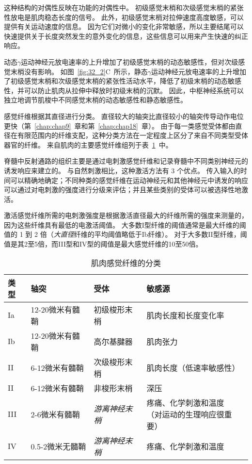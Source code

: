 \begin{proposition}[肌梭]
	\quad \quad 这种结构的对偶性反映在功能的对偶性中。
	初级感觉末梢和次级感觉末梢的紧张性放电是肌肉稳态长度的信号。
	此外，初级感觉末梢对拉伸速度高度敏感，可以提供有关运动速度的信息。
	因为它们对微小的变化非常敏感，所以主要结尾可以快速提供关于长度突然发生的意外变化的信息，这些信息可以用来产生快速的纠正响应。
	
	\quad \quad 动态$ \gamma $运动神经元放电速率的上升增加了初级感觉末梢的动态敏感性，但对次级感觉末梢没有影响。
	如图~\ref{fig:32_2}C~所示，静态$ \gamma $运动神经元放电速率的上升增加了初级感觉末梢和次级感觉末梢的紧张性活动水平，降低了初级末梢的动态敏感性，并可以防止肌肉从拉伸中释放时初级末梢的沉默。
	因此，中枢神经系统可以独立地调节肌梭中不同感觉末梢的动态敏感性和静态敏感性。
	
\end{proposition}


\begin{proposition}[肌肉感觉纤维的分类] \label{box:32_2}
	
	\quad \quad 感觉纤维根据其直径进行分类。
	直径较大的轴突比直径较小的轴突传导动作电位更快（第~\ref{chap:chap9}~章和第~\ref{chap:chap18}~章）。
	由于每一类感觉受体都由直径在有限范围内的纤维支配，这种分类方法在一定程度上区分了来自不同类型受体器官的纤维。
	来自肌肉的主要感觉纤维组列于表~\ref{tab:32_1}~中。
	
	\quad \quad 脊髓中反射通路的组织主要是通过电刺激感觉纤维和记录脊髓中不同类别神经元的诱发响应来建立的。
	与自然刺激相比，这种激活方法有 3 个优点。
	传入输入的时间可以精确地确定；不同种类的感觉纤维在运动神经元和其他神经元中诱发的响应可以通过对电刺激的强度进行分级来评估；并且某些类别的受体可以被选择性地激活。
	
	\quad \quad 激活感觉纤维所需的电刺激强度是根据激活直径最大的纤维所需的强度来测量的，因为这些纤维具有最低的电激活阈值。
	大多数I型纤维的阈值通常是最大纤维的阈值的 1 到 2 倍（\textit{大直径}纤维的平均阈值略低于Ib纤维）。
	对于大多数II型纤维，阈值是其2至5倍，而III型和IV型的阈值是最大感觉纤维的10至50倍。
	
\end{proposition}


\begin{table}[htbp]
	\caption{肌肉感觉纤维的分类} \label{tab:32_1} \centering
	\begin{tabular}{llll}
		\toprule
		类型 & 轴突 & 受体 & 敏感源 \\
		\midrule
		Ia & 12-20微米有髓鞘 & 初级梭形末梢 & 肌肉长度和长度变化率 \\
		Ib & 12-20微米有髓鞘 & 高尔基腱器 & 肌肉张力 \\
		II & 6-12微米有髓鞘 & 次级梭形末梢 & 肌肉长度（低速率敏感性） \\
		II & 6-12微米有髓鞘 & 非梭形末梢 & 深压 \\
		III & 2-6微米有髓鞘 & \textit{游离神经末梢} & \makecell[l]{疼痛、化学刺激和温度\\（对运动的生理响应很重要}） \\
		IV & 0.5-2微米无髓鞘 & \textit{游离神经末梢} & 疼痛、化学刺激和温度 \\
		\bottomrule
	\end{tabular}
\end{table}


